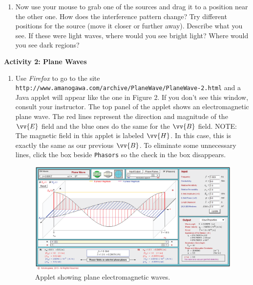 \begin{enumerate}
\item Now use your mouse to grab one of the sources and drag it to a position
near the other one.
How does the interference pattern change?
Try different positions for the source (move it closer or further away).
Describe what you see.
If these were light waves, where would you see bright light?
Where would you see dark regions?
\vspace{2.0cm}

\end{enumerate}

\textbf{Activity 2: Plane Waves}


\begin{enumerate}

\item  Use {\it Firefox} to go to the site
{\tt \verb!http://www.amanogawa.com/archive/PlaneWave/PlaneWave-2.html!} and a Java applet will appear 
like the one in Figure 2. 
If you don't see this window, consult your instructor.
The top panel of the applet shows an electromagnetic plane wave.
The red lines represent the direction and magnitude of the $\vv {E}$ field and the
blue ones do the same for the $\vv {B}$ field.
NOTE: The magnetic field in this applet is labeled $\vv {H}$.
In this case, this is exactly the same as our previous $\vv {B}$.
To eliminate some unnecessary lines, click the box beside {\tt Phasors} so the check in the box 
disappears.
\begin{figure}[hbt]
\begin{center}
\includegraphics[width=5.0in]{plane_waves/plane_wave_screenshot.eps}
\caption{Applet showing plane electromagnetic waves.}
\end{center}
\end{figure}


\end{enumerate}
